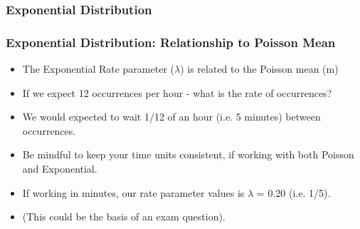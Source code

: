 \documentclass{beamer}
\begin{document}
\begin{frame}[fragile]
\frametitle{Exponential Distribution}

\end{frame}



\begin{frame}[fragile]
\frametitle{Exponential Distribution: Relationship to Poisson Mean}
\begin{itemize}
\item The Exponential Rate parameter ($\lambda$) is related to the Poisson mean (m)
\item If we expect 12 occurrences per hour - what is the rate of occurrences?
\item We would expected to wait 1/12 of an hour (i.e. 5 minutes) between occurrences.
\item Be mindful to keep your time units consistent, if working with both Poisson and Exponential.
\item If working in minutes, our rate parameter values is $\lambda$ = 0.20 (i.e. 1/5).
\item (This could be the basis of an exam question).
\end{itemize}
\end{frame}
\end{document}
